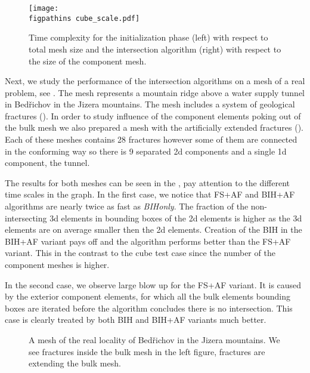 \begin{figure}[!htb]
    \centering
    \texttt{[image: \\figpathins cube\_scale.pdf]}
    \caption{Time complexity for the initialization phase (left) with respect to total mesh size and the intersection algorithm (right) with respect to the size of the component mesh.}
    \label{fig:cube_speed}
\end{figure}



Next, we study the performance of the intersection algorithms on a mesh of a real problem, see .
The mesh represents a mountain ridge above a water supply tunnel in Bed{\v r}ichov in the Jizera mountains.
The mesh includes a system of geological fractures (). In order to study influence of the component elements poking out of
the bulk mesh we also prepared a mesh with the artificially extended fractures (). 
Each of these meshes contains 28 fractures however some of them are connected in the conforming way so there is 9 separated 2d components and a 
single 1d component, the tunnel.

The results for both meshes can be seen in the , pay attention to the different time
scales in the graph. In the first case, we notice that FS+AF and BIH+AF algorithms are nearly twice as fast as \emph{BIHonly}.
The fraction of the non-intersecting 3d elements in bounding boxes of the 2d elements is higher as the 3d elements are on average smaller then the 2d elements.
Creation of the BIH in the BIH+AF variant pays off and the algorithm performs better than the FS+AF variant.
This in the contrast to the cube test case since the number of the component meshes is higher.

In the second case, we observe large blow up for the FS+AF variant. It is caused by the exterior component elements, 
for which all the bulk elements bounding boxes are iterated before the algorithm concludes there is no intersection.
This case is clearly treated by both BIH and BIH+AF variants much better.



\begin{figure}[!htb]
    \hspace{3pt}
    \caption{A mesh of the real locality of Bed{\v r}ichov in the Jizera mountains.
             We see fractures inside the bulk mesh in the left figure,
             fractures are extending the bulk mesh.}
    \label{fig:bedrichov_meshes}
\end{figure}

